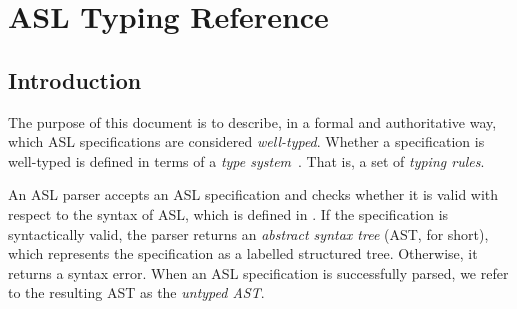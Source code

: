 % 
% 
% 
% 
% 
% 
% 
% 

\newcommand\todocomment[1]{}


% 


% 

% 

\part{ASL Typing Reference}

\chapter{Introduction}

The purpose of this document is to describe, in a formal and authoritative way,
which ASL specifications are considered \emph{well-typed}.
Whether a specification is well-typed is defined in terms of a \emph{type system}~\cite{TypeSystemsLucaCardelli}.
That is, a set of \emph{typing rules}.

An ASL parser accepts an ASL specification and checks whether it is valid with respect to the syntax of ASL,
which is defined in .
If the specification is syntactically valid, the parser returns an \emph{abstract syntax tree} (AST, for short),
which represents the specification as a labelled structured tree. Otherwise, it returns a syntax error.
When an ASL specification is successfully parsed, we refer to the resulting AST as the \emph{untyped AST}.


